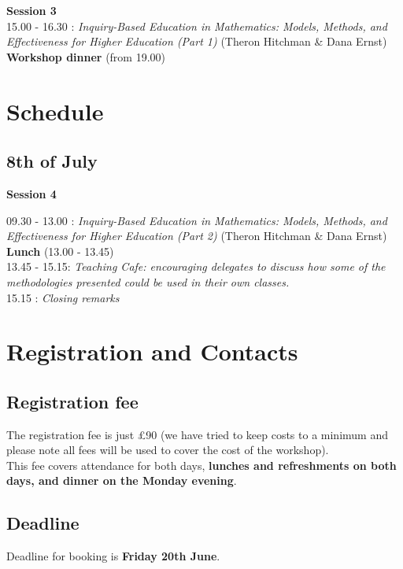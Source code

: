 \documentclass[a4paper]{leaflet}
\begin{document}
\textbf{Session 3}\\

15.00 - 16.30 : \textit{Inquiry-Based Education in Mathematics: Models, Methods, and Effectiveness for Higher Education (Part 1)} (Theron Hitchman \& Dana Ernst)\\

\textbf{Workshop dinner} (from 19.00)

\newpage
\section{Schedule}
\subsection{8th of July}
\vspace{1cm}

\textbf{Session 4}
\vspace{1cm}

09.30 - 13.00 : \textit{Inquiry-Based Education in Mathematics: Models, Methods, and Effectiveness for Higher Education (Part 2)} (Theron Hitchman \& Dana Ernst)\\

\textbf{Lunch} (13.00 - 13.45)\\

13.45 - 15.15: \textit{Teaching Cafe: encouraging delegates to discuss how some of the methodologies presented could be used in their own classes.}\\

15.15 : \textit{Closing remarks}

\newpage
\section{Registration and Contacts}
\subsection{Registration fee}

The registration fee is just \pounds90 (we have tried to keep costs to a minimum and please note all fees will be used to cover the cost of the workshop). \\

This fee covers attendance for both days, \textbf{lunches and refreshments on both days, and dinner on the Monday evening}.\\


\subsection{Deadline}
Deadline for booking is \textbf{Friday 20th June}.\\
\end{document}
